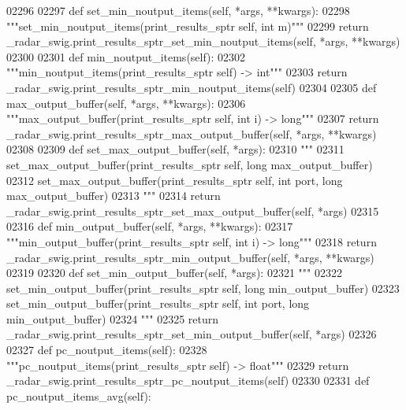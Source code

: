 \begin{DoxyCode}
{{{{{{{{{02296 
02297     \textcolor{keyword}{def }set_min_noutput_items(self, *args, **kwargs):
02298         \textcolor{stringliteral}{"""set\_min\_noutput\_items(print\_results\_sptr self, int m)"""}
02299         \textcolor{keywordflow}{return} \_radar\_swig.print\_results\_sptr\_set\_min\_noutput\_items(self, *args, **kwargs)
02300 
02301     \textcolor{keyword}{def }min_noutput_items(self):
02302         \textcolor{stringliteral}{"""min\_noutput\_items(print\_results\_sptr self) -> int"""}
02303         \textcolor{keywordflow}{return} \_radar\_swig.print\_results\_sptr\_min\_noutput\_items(self)
02304 
02305     \textcolor{keyword}{def }max_output_buffer(self, *args, **kwargs):
02306         \textcolor{stringliteral}{"""max\_output\_buffer(print\_results\_sptr self, int i) -> long"""}
02307         \textcolor{keywordflow}{return} \_radar\_swig.print\_results\_sptr\_max\_output\_buffer(self, *args, **kwargs)
02308 
02309     \textcolor{keyword}{def }set_max_output_buffer(self, *args):
02310         \textcolor{stringliteral}{"""}
02311 \textcolor{stringliteral}{        set\_max\_output\_buffer(print\_results\_sptr self, long max\_output\_buffer)}
02312 \textcolor{stringliteral}{        set\_max\_output\_buffer(print\_results\_sptr self, int port, long max\_output\_buffer)}
02313 \textcolor{stringliteral}{        """}
02314         \textcolor{keywordflow}{return} \_radar\_swig.print\_results\_sptr\_set\_max\_output\_buffer(self, *args)
02315 
02316     \textcolor{keyword}{def }min_output_buffer(self, *args, **kwargs):
02317         \textcolor{stringliteral}{"""min\_output\_buffer(print\_results\_sptr self, int i) -> long"""}
02318         \textcolor{keywordflow}{return} \_radar\_swig.print\_results\_sptr\_min\_output\_buffer(self, *args, **kwargs)
02319 
02320     \textcolor{keyword}{def }set_min_output_buffer(self, *args):
02321         \textcolor{stringliteral}{"""}
02322 \textcolor{stringliteral}{        set\_min\_output\_buffer(print\_results\_sptr self, long min\_output\_buffer)}
02323 \textcolor{stringliteral}{        set\_min\_output\_buffer(print\_results\_sptr self, int port, long min\_output\_buffer)}
02324 \textcolor{stringliteral}{        """}
02325         \textcolor{keywordflow}{return} \_radar\_swig.print\_results\_sptr\_set\_min\_output\_buffer(self, *args)
02326 
02327     \textcolor{keyword}{def }pc_noutput_items(self):
02328         \textcolor{stringliteral}{"""pc\_noutput\_items(print\_results\_sptr self) -> float"""}
02329         \textcolor{keywordflow}{return} \_radar\_swig.print\_results\_sptr\_pc\_noutput\_items(self)
02330 
02331     \textcolor{keyword}{def }pc_noutput_items_avg(self):
}}}}}}}}}
\end{DoxyCode}
